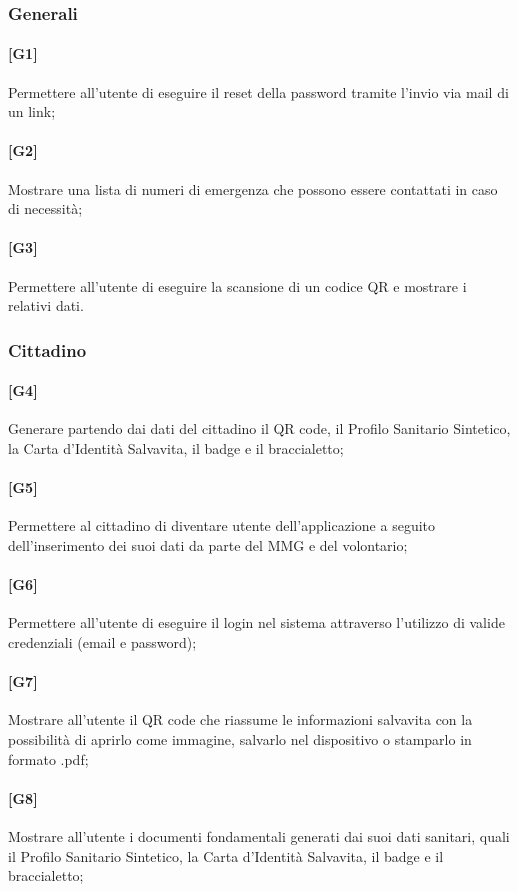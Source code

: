 \documentclass[12pt,a4paper,twoside,openright,titlepage]{book}
\begin{document}
\subsubsection{Generali}
\paragraph{[G1]} Permettere all'utente di eseguire il reset della password tramite l'invio via mail di un link;
\paragraph{[G2]} Mostrare una lista di numeri di emergenza che possono essere contattati in caso di necessità;
\paragraph{[G3]} Permettere all'utente di eseguire la scansione di un codice QR e mostrare i relativi dati.

\subsubsection{Cittadino}
\paragraph{[G4]} Generare partendo dai dati del cittadino il QR code, il Profilo Sanitario Sintetico, la Carta d'Identità Salvavita, il badge e il braccialetto;
\paragraph{[G5]} Permettere al cittadino di diventare utente dell'applicazione a seguito dell'inserimento dei suoi dati da parte del MMG e del volontario;
\paragraph{[G6]} Permettere all'utente di eseguire il login nel sistema attraverso l'utilizzo di valide credenziali (email e password);
\paragraph{[G7]} Mostrare all'utente il QR code che riassume le informazioni salvavita con la possibilità di aprirlo come immagine, salvarlo nel dispositivo o stamparlo in formato .pdf;
\paragraph{[G8]} Mostrare all'utente i documenti fondamentali generati dai suoi dati sanitari, quali il Profilo Sanitario Sintetico, la Carta d'Identità Salvavita, il badge e il braccialetto;
\end{document}
